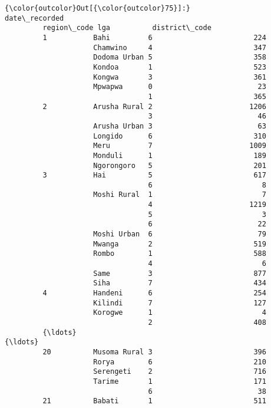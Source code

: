 \documentclass[11pt]{article}
\begin{document}
\begin{Verbatim}[commandchars=\\\{\}]
{\color{outcolor}Out[{\color{outcolor}75}]:}                                         date\_recorded
         region\_code lga          district\_code               
         1           Bahi         6                        224
                     Chamwino     4                        347
                     Dodoma Urban 5                        358
                     Kondoa       1                        523
                     Kongwa       3                        361
                     Mpwapwa      0                         23
                                  1                        365
         2           Arusha Rural 2                       1206
                                  3                         46
                     Arusha Urban 3                         63
                     Longido      6                        310
                     Meru         7                       1009
                     Monduli      1                        189
                     Ngorongoro   5                        201
         3           Hai          5                        617
                                  6                          8
                     Moshi Rural  1                          7
                                  4                       1219
                                  5                          3
                                  6                         22
                     Moshi Urban  6                         79
                     Mwanga       2                        519
                     Rombo        1                        588
                                  4                          6
                     Same         3                        877
                     Siha         7                        434
         4           Handeni      6                        254
                     Kilindi      7                        127
                     Korogwe      1                          4
                                  2                        408
         {\ldots}                                               {\ldots}
         20          Musoma Rural 3                        396
                     Rorya        6                        210
                     Serengeti    2                        716
                     Tarime       1                        171
                                  6                         38
         21          Babati       1                        511

\end{Verbatim}
\end{document}
